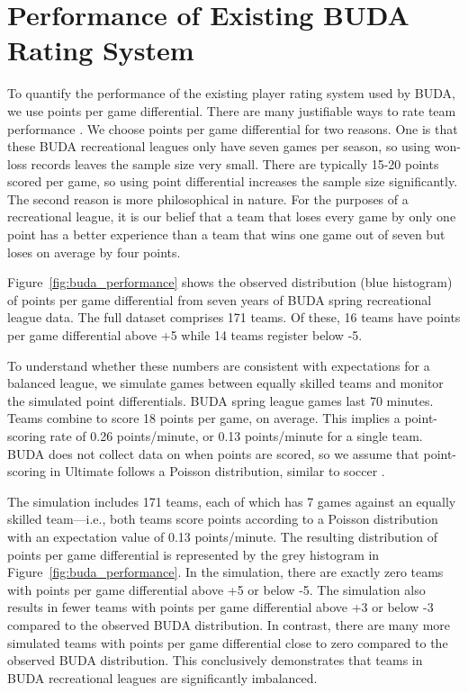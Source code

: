 \section{Performance of Existing BUDA Rating System}\label{sec:existing_performance}

To quantify the performance of the existing player rating system used by BUDA, we use points per game differential. There are many justifiable ways to rate team performance \cite{Langville_2012}.  We choose points per game differential for two reasons.  One is that these BUDA recreational leagues only have seven games per season, so using won-loss records leaves the sample size very small.  There are typically 15-20 points scored per game, so using point differential increases the sample size significantly.  The second reason is more philosophical in nature.  For the purposes of a recreational league, it is our belief that a team that loses every game by only one point has a better experience than a team that wins one game out of seven but loses on average by four points.  

Figure~\ref{fig:buda_performance} shows the observed distribution (blue histogram) of points per game differential from seven years of BUDA spring recreational league data.  The full dataset comprises 171 teams.  Of these, 16 teams have points per game differential above +5 while 14 teams register below -5.  

To understand whether these numbers are consistent with expectations for a balanced league, we simulate games between equally skilled teams and monitor the simulated point differentials.  BUDA spring league games last 70 minutes.  Teams combine to score 18 points per game, on average. This implies a point-scoring rate of 0.26 points/minute, or 0.13 points/minute for a single team.  BUDA does not collect data on when points are scored, so we assume that point-scoring in Ultimate follows a Poisson distribution, similar to soccer \cite{Heuer_2010}.

The simulation includes 171 teams, each of which has 7 games against an equally skilled team---i.e., both teams score points according to a Poisson distribution with an expectation value of 0.13 points/minute. The resulting distribution of points per game differential is represented by the grey histogram in Figure~\ref{fig:buda_performance}.  In the simulation, there are exactly zero teams with points per game differential above +5 or below -5.  The simulation also results in fewer teams with points per game differential above +3 or below -3 compared to the observed BUDA distribution.  In contrast, there are many more simulated teams with points per game differential close to zero compared to the observed BUDA distribution.  This conclusively demonstrates that teams in BUDA recreational leagues are significantly imbalanced.

